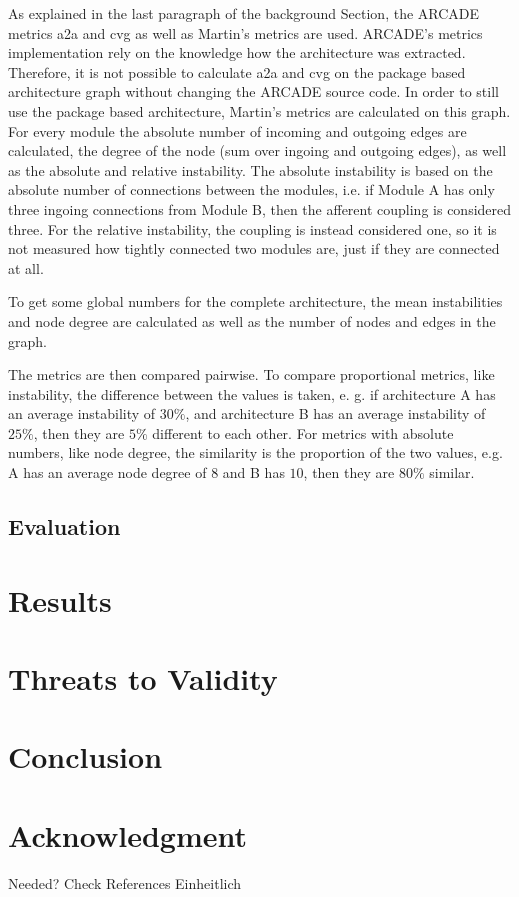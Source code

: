 \documentclass[conference]{IEEEtran}
\begin{document}
As explained in the last paragraph of the background Section, the ARCADE metrics a2a and cvg as well as Martin's metrics are used. ARCADE's metrics implementation rely on the knowledge how the architecture was extracted. Therefore, it is not possible to calculate a2a and cvg on the package based architecture graph without changing the ARCADE source code. In order to still use the package based architecture, Martin's metrics are calculated on this graph. For every module the absolute number of incoming and outgoing edges are calculated, the degree of the node (sum over ingoing and outgoing edges), as well as the absolute and relative instability. The absolute instability is based on the absolute number of connections between the modules, i.e. if Module A has only three ingoing connections from Module B, then the afferent coupling is considered three. For the relative instability, the coupling is instead considered one, so it is not measured how tightly connected two modules are, just if they are connected at all.

To get some global numbers for the complete architecture, the mean instabilities and node degree are calculated as well as the number of nodes and edges in the graph.

The metrics are then compared pairwise. To compare proportional metrics, like instability, the difference between the values is taken, e. g. if architecture A has an average instability of $30\%$, and architecture B has an average instability of $25\%$, then they are $5\%$ different to each other. For metrics with absolute numbers, like node degree, the similarity is the proportion of the two values, e.g. A has an average node degree of $8$ and B has $10$, then they are $80\%$ similar. 

\subsection{Evaluation}



\section{Results}

\section{Threats to Validity}

\section{Conclusion}

\section*{Acknowledgment}

Needed?
Check References Einheitlich



\end{document}
